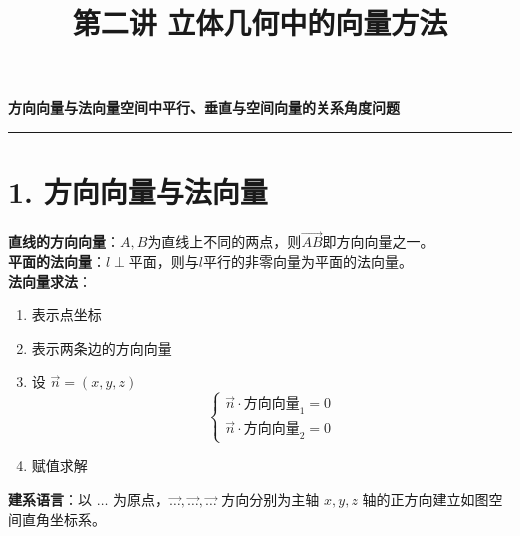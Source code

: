 \documentclass[12pt, a4paper]{article}
\title{\vspace{-2cm}第二讲 立体几何中的向量方法}
\author{}
\date{}
\begin{document}
\maketitle
\vspace{-1.5cm}

\noindent\textbf{方向向量与法向量\quad 空间中平行、垂直与空间向量的关系\quad 角度问题}

\vspace{0.3cm}
\hrule
\vspace{0.5cm}

\section*{1. 方向向量与法向量}

\begin{minipage}[t]{0.45\textwidth}
    \textbf{直线的方向向量}：$A, B$为直线上不同的两点，则$\overrightarrow{AB}$即方向向量之一。\\
    
    \textbf{平面的法向量}：$l \perp \text{平面}$，则与$l$平行的非零向量为平面的法向量。\\
    
    \textbf{法向量求法}：
    \begin{enumerate}
        \item 表示点坐标
        \item 表示两条边的方向向量
        \item 设 $\vec{n} = (x, y, z)$ 
        $$
        \begin{cases} 
        \vec{n} \cdot \text{方向向量}_1 = 0 \\ 
        \vec{n} \cdot \text{方向向量}_2 = 0 
        \end{cases}
        $$
        \item 赋值求解
    \end{enumerate}
    \vspace{0.2cm}
    
    \textbf{建系语言}：以 $\dots$ 为原点，$\overrightarrow{\dots}, \overrightarrow{\dots}, \overrightarrow{\dots}$ 方向分别为主轴 $x, y, z$ 轴的正方向建立如图空间直角坐标系。
\end{minipage}%
\hfill
\end{document}
